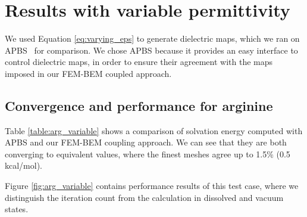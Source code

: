 


\section*{\sffamily \Large Results with variable permittivity}

We used Equation \eqref{eq:varying_eps} to generate dielectric maps, which we ran on APBS~\cite{BakerETal2001} for comparison. 
We chose APBS because it provides an easy interface to control dielectric maps, in order to ensure their agreement with the maps imposed in our FEM-BEM coupled approach.

\subsection*{\sffamily \large Convergence and performance for arginine}

Table \ref{table:arg_variable} shows a comparison of solvation energy computed with APBS and our FEM-BEM coupling approach. We can see that they are both converging to equivalent values, where the finest meshes agree up to 1.5\% (0.5 kcal/mol).

Figure \ref{fig:arg_variable} contains performance results of this test case, where we distinguish the iteration count from the calculation in dissolved and vacuum states. 

